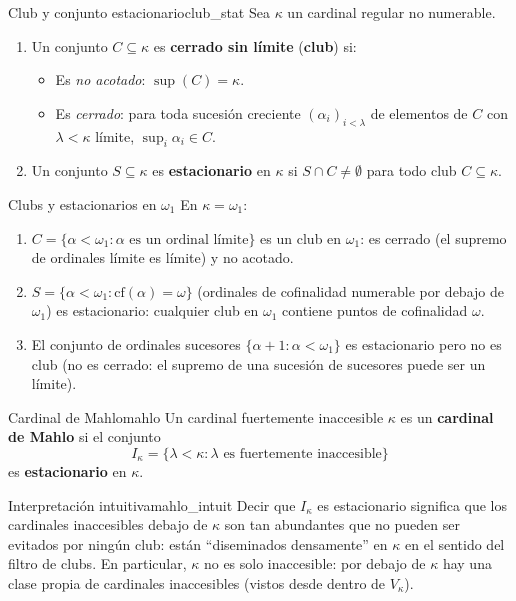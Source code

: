 \begin{definicion}{Club y conjunto estacionario}{club_stat}
Sea $\kappa$ un cardinal regular no numerable.
\begin{enumerate}[leftmargin=2em, label=(\alph*)]
  \item Un conjunto $C \subseteq \kappa$ es \textbf{cerrado sin límite} (\textbf{club}) si:
    \begin{itemize}
      \item Es \emph{no acotado}: $\sup(C) = \kappa$.
      \item Es \emph{cerrado}: para toda sucesión creciente $(\alpha_i)_{i < \lambda}$ de elementos de $C$ con $\lambda < \kappa$ límite, $\sup_i \alpha_i \in C$.
    \end{itemize}
  \item Un conjunto $S \subseteq \kappa$ es \textbf{estacionario} en $\kappa$ si $S \cap C \neq \emptyset$ para todo club $C \subseteq \kappa$.
\end{enumerate}
\end{definicion}

\begin{ejemplo}{Clubs y estacionarios en $\omega_1$}{}
En $\kappa = \omega_1$:
\begin{enumerate}[leftmargin=2em, label=(\alph*)]
  \item $C = \{\alpha < \omega_1 : \alpha \text{ es un ordinal límite}\}$ es un club en $\omega_1$: es cerrado (el supremo de ordinales límite es límite) y no acotado.
  \item $S = \{\alpha < \omega_1 : \mathrm{cf}(\alpha) = \omega\}$ (ordinales de cofinalidad numerable por debajo de $\omega_1$) es estacionario: cualquier club en $\omega_1$ contiene puntos de cofinalidad $\omega$.
  \item El conjunto de ordinales sucesores $\{\alpha + 1 : \alpha < \omega_1\}$ es estacionario pero no es club (no es cerrado: el supremo de una sucesión de sucesores puede ser un límite).
\end{enumerate}
\end{ejemplo}

\begin{definicion}{Cardinal de Mahlo}{mahlo}
Un cardinal fuertemente inaccesible $\kappa$ es un \textbf{cardinal de Mahlo} si el conjunto
\[
  I_\kappa = \{\lambda < \kappa : \lambda \text{ es fuertemente inaccesible}\}
\]
es \textbf{estacionario} en $\kappa$.
\end{definicion}

\begin{observacion}{Interpretación intuitiva}{mahlo_intuit}
Decir que $I_\kappa$ es estacionario significa que los cardinales inaccesibles debajo de $\kappa$ son tan abundantes que no pueden ser evitados por ningún club: están ``diseminados densamente'' en $\kappa$ en el sentido del filtro de clubs. En particular, $\kappa$ no es solo inaccesible: por debajo de $\kappa$ hay una clase propia de cardinales inaccesibles (vistos desde dentro de $V_\kappa$).
\end{observacion}

